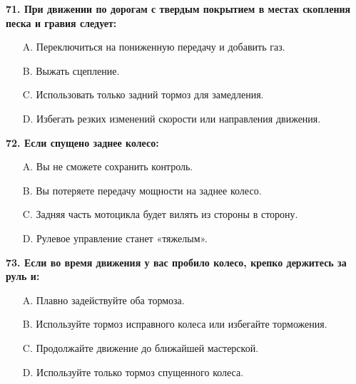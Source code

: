 \begin{minipage}{\linewidth}
\vspace{1em}\noindent\textbf{71. При движении по дорогам с твердым покрытием в местах скопления песка и гравия следует:}

\begin{itemize}[nosep,leftmargin=2em]
\item [A.] Переключиться на пониженную передачу и добавить газ.
\item [B.] Выжать сцепление.
\item [C.] Использовать только задний тормоз для замедления.
\item [D.] Избегать резких изменений скорости или направления движения.

\end{itemize}
\end{minipage}


\begin{minipage}{\linewidth}
\vspace{1em}\noindent\textbf{72. Если спущено заднее колесо:}

\begin{itemize}[nosep,leftmargin=2em]
\item [A.] Вы не сможете сохранить контроль.
\item [B.] Вы потеряете передачу мощности на заднее колесо.
\item [C.] Задняя часть мотоцикла будет вилять из стороны в сторону.
\item [D.] Рулевое управление станет «тяжелым».

\end{itemize}
\end{minipage}


\begin{minipage}{\linewidth}
\vspace{1em}\noindent\textbf{73. Если во время движения у вас пробило колесо, крепко держитесь за руль и:}

\begin{itemize}[nosep,leftmargin=2em]
\item [A.] Плавно задействуйте оба тормоза.
\item [B.] Используйте тормоз исправного колеса или избегайте торможения.
\item [C.] Продолжайте движение до ближайшей мастерской.
\item [D.] Используйте только тормоз спущенного колеса.

\end{itemize}
\end{minipage}


